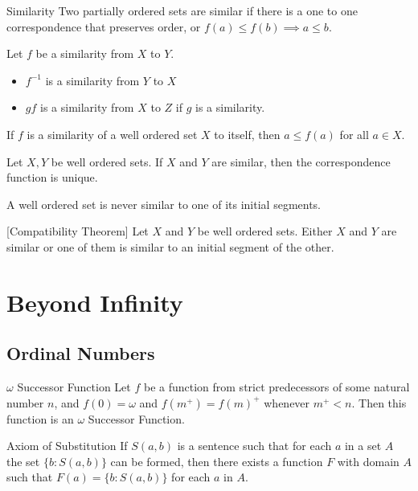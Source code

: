 \begin{defn}{Similarity}{} Two partially ordered sets are similar if there is a one to one correspondence that preserves order, or $f(a)\leq f(b)\implies a\leq b$. 
\end{defn}

\begin{prp}{}{} Let $f$ be a similarity from $X$ to $Y$. 
\begin{itemize}
\item $f^{-1}$ is a similarity from $Y$ to $X$
\item $gf$ is a similarity from $X$ to $Z$ if $g$ is a similarity. 
\end{itemize}
\end{prp}

\begin{thm}{}{} If $f$ is a similarity of a well ordered set $X$ to itself, then $a\leq f(a)$ for all $a\in X$. 
\end{thm}

\begin{thm}{}{} Let $X,Y$ be well ordered sets. If $X$ and $Y$ are similar, then the correspondence function is unique. 
\end{thm}

\begin{thm}{}{} A well ordered set is never similar to one of its initial segments. 
\end{thm}

\begin{thm}{}{}[Compatibility Theorem] Let $X$ and $Y$ be well ordered sets. Either $X$ and $Y$ are similar or one of them is similar to an initial segment of the other. 
\end{thm}

\pagebreak
\section{Beyond Infinity}
\subsection{Ordinal Numbers}
\begin{defn}{$\omega$ Successor Function}{} Let $f$ be a function from strict predecessors of some natural number $n$, and $f(0)=\omega$ and $f(m^+)=f(m)^+$ whenever $m^+<n$. Then this function is an $\omega$ Successor Function. 
\end{defn}

\begin{axm}{Axiom of Substitution}{} If $S(a,b)$ is a sentence such that for each $a$ in a set $A$ the set $\{b:S(a,b)\}$ can be formed, then there exists a function $F$ with domain $A$ such that $F(a)=\{b:S(a,b)\}$ for each $a$ in $A$. 
\end{axm}

